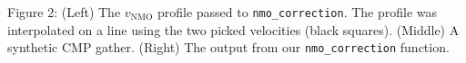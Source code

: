 Figure 2: (Left) The $v_\mathrm{NMO}$ profile passed to
\texttt{nmo\_correction}.
The profile was interpolated on a line using the two picked velocities (black
squares). (Middle) A synthetic CMP gather. (Right) The output
from our \texttt{nmo\_correction} function.
